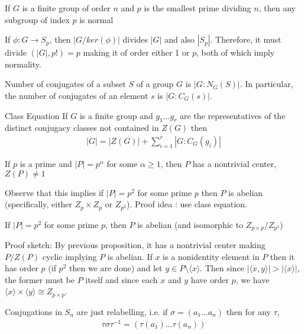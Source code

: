 \documentclass[titlepage, 12pt]{book}
\begin{document}
\begin{theorem}{}{}
    If $G$ is a finite group of order $n$ and $p$ is the smallest prime dividing
    $n$, then any subgroup of index $p$ is normal
\end{theorem}
If $\phi:G\rightarrow S_p$, then $|G/ker(\phi)|$ divides $|G|$ and also $|S_p|$.
Therefore, it must divide $(|G|, p!) = p$ making it of order either 1 or $p$,
both of which imply normality.

\begin{proposition}{}{}
    Number of conjugates of a subset $S$ of a group $G$ is $|G:N_G(S)|$. In
    particular, the number of conjugates of an element $s$ is $|G:C_G(s)|$.
\end{proposition}

\begin{theorem}{Class Equation}{}
    If $G$ is a finite group and $g_1\dots g_r$ are the representatives of the
    distinct conjugacy classes not contained in $Z(G)$ then
    \begin{gather*}
        |G| = |Z(G)| + \sum_{i = 1}^r |G : C_G(g_i)|
    \end{gather*}
\end{theorem}

\begin{theorem}{}{}
    If $p$ is a prime and $|P| = p^\alpha$ for some $\alpha\geq 1$, then $P$ has
    a nontrivial center, $Z(P)\neq 1$
\end{theorem}
Observe that this implies if $|P| = p^2$ for some prime $p$ then $P$ is abelian
(specifically, either $Z_p\times Z_p$ or $Z_{p^2}$). Proof idea : use class
equation.

\begin{proposition}{}{}
    If $|P| = p^2$ for some prime $p$, then $P$ is abelian (and isomorphic to
    $Z_{p\times p}/Z_{p^2}$)
\end{proposition}
Proof sketch: By previous proposition, it has a nontrivial center making
$P/Z(P)$ cyclic implying $P$ is abelian. If $x$ is a nonidentity element in $P$
then it has order $p$ (if $p^2$ then we are done) and let $y\in P \setminus
\langle x\rangle$. Then since $|\langle x, y\rangle | > |\langle x\rangle |$,
the former must be $P$ itself and since each $x$ and $y$ have order $p$, we have
$\langle x\rangle \times \langle y\rangle\cong Z_{p\times p}$.

\begin{proposition}{}{}
    Conjugations in $S_n$ are just relabelling, i.e. if $\sigma = (a_1\dots
    a_n)$ then for any $\tau$,
    \begin{gather*}
        \tau\sigma\tau^{-1} = (\tau(a_1)\dots\tau(a_n))
    \end{gather*}
\end{proposition}
\end{document}
